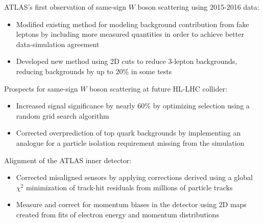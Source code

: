 \documentclass[11pt]{res}
\begin{document}
\begin{resume}
    ATLAS's first observation of same-sign $W$ boson scattering using 2015-2016 data:
    \begin{itemize}
    \item Modified existing method for modeling background contribution from fake leptons by including more measured quantities in order to achieve better data-simulation agreement
    \item Developed new method using 2D cuts to reduce 3-lepton backgrounds, reducing backgrounds by up to 20\% in some tests
    \end{itemize}
    Prospects for same-sign $W$ boson scattering at future HL-LHC collider:
    \begin{itemize}
    \item Increased signal significance by nearly 60\% by optimizing selection using a random grid search algorithm
    \item Corrected overprediction of top quark backgrounds by implementing an analogue for a particle isolation requirement missing from the simulation
    \end{itemize}
    Alignment of the ATLAS inner detector:
    \begin{itemize}
    \item Corrected misaligned sensors by applying corrections derived using a global $\chi^2$ minimization of track-hit residuals from millions of particle tracks
    \item Measure and correct for momentum biases in the detector using 2D maps created from fits of electron energy and momentum distributions
    \end{itemize}



\end{resume}
\end{document}
